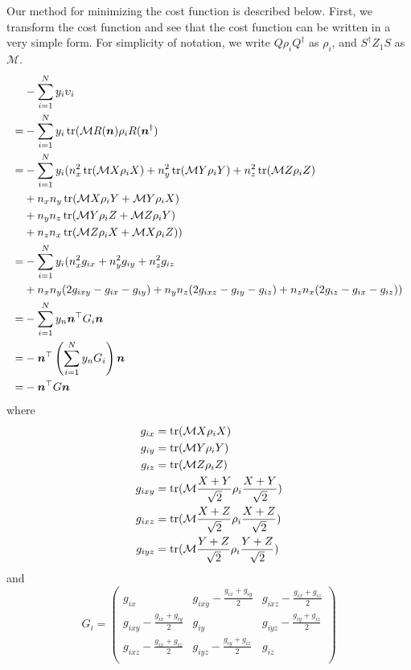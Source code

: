 \par Our method for minimizing the cost function is described below. First, we transform the cost function and see that the cost function can be written in a very simple form. For simplicity of notation, we write $Q\rho_i Q^\dagger$ as $\rho_i$, and $S^\dagger Z_1 S$ as $\mathcal{M}$.
$$
\begin{aligned}
&-\sum_{i=1}^Ny_i\upsilon_i\\
=&-\sum_{i=1}^N y_{i}\operatorname{tr}(\mathcal{M} R(\bm{n}){\rho_{i}}R(\bm{n}^\dagger)\\
=&-\sum_{i=1}^N y_{i} (n_{x}^2\operatorname{tr}(\mathcal{M} X\rho_{i} X)+n_{y}^2\operatorname{tr}(\mathcal{M} Y\rho_{i} Y)+n_{z}^2\operatorname{tr}(\mathcal{M} Z\rho_{i} Z)\\
&+n_{x}n_{y}\operatorname{tr}(\mathcal{M} X\rho_{i} Y+\mathcal{M} Y\rho_{i} X)\\
&+n_{y}n_{z}\operatorname{tr}(\mathcal{M} Y\rho_{i} Z+\mathcal{M} Z\rho_{i}Y)\\
&+n_{z}n_{x}\operatorname{tr}(\mathcal{M} Z\rho_{i} X+\mathcal{M} X\rho_{i} Z))\\
=&-\sum_{i=1}^N y_{i}(n_{x}^2 g_{ix} + n_{y}^2 g_{iy} + n_{z}^2 g_{iz}\\
&+n_{x}n_{y}(2g_{ixy}-g_{ix}-g_{iy})+n_{y}n_{z}(2g_{ixz}-g_{iy}-g_{iz})+n_{z}n_{x}(2g_{iz}-g_{ix}-g_{iz}))\\
=&-\sum_{i=1}^N y_{n}\bm{n}^\top G_{i} \bm{n}\\
=&-\bm{n}^\top\left(\sum_{i=1}^N  y_{n}G_{i}\right)\bm{n}\\
=&-\bm{n}^\top G \bm{n}\\
\end{aligned}
$$
where 
$$
\begin{aligned}
g_{ix}&=\operatorname{tr}(\mathcal{M} X\rho_{i}X)\\
g_{iy}&=\operatorname{tr}(\mathcal{M} Y\rho_{i}Y)\\
g_{iz}&=\operatorname{tr}(\mathcal{M} Z\rho_{i}Z)\\
g_{ixy}&=\operatorname{tr}(\mathcal{M} \frac{X+Y}{\sqrt{2}}\rho_{i}\frac{X+Y}{\sqrt{2}})\\
g_{ixz}&=\operatorname{tr}(\mathcal{M} \frac{X+Z}{\sqrt{2}}\rho_{i}\frac{X+Z}{\sqrt{2}})\\
g_{iyz}&=\operatorname{tr}(\mathcal{M} \frac{Y+Z}{\sqrt{2}}\rho_{i}\frac{Y+Z}{\sqrt{2}})\\
\end{aligned}$$
and
$$G_{i}=
\begin{pmatrix}
g_{ix} & g_{ixy}-\frac{g_{ix}+g_{iy}}{2} & g_{ixz}-\frac{g_{ix}+g_{iz}}{2}\\
g_{ixy}-\frac{g_{ix}+g_{iy}}{2} & g_{iy} & g_{iyz}-\frac{g_{iy}+g_{iz}}{2}\\
g_{ixz}-\frac{g_{ix}+g_{iz}}{2} & g_{iyz}-\frac{g_{iy}+g_{iz}}{2} & g_{iz}\\
\end{pmatrix}
$$

